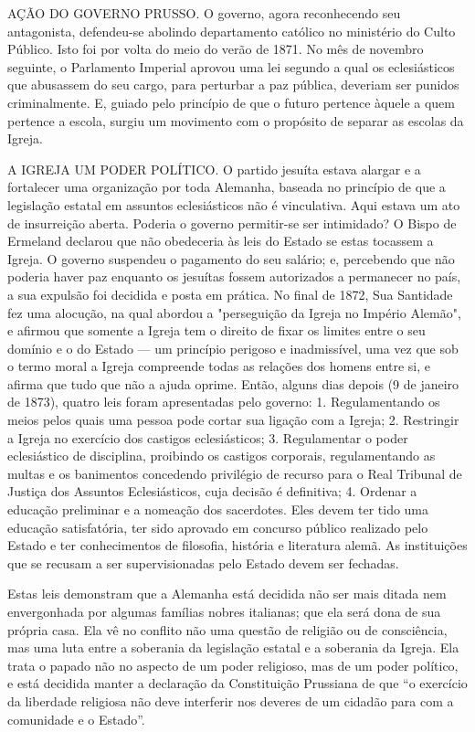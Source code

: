 \documentclass[11pt,a5paper,twoside,openany]{book}
\begin{document}
AÇÃO DO GOVERNO PRUSSO. O governo, agora reconhecendo seu antagonista, defendeu-se abolindo departamento católico no ministério do Culto Público. Isto foi por volta do meio do verão de 1871. No mês de novembro seguinte, o Parlamento Imperial aprovou uma lei segundo a qual os eclesiásticos que abusassem do seu cargo, para perturbar a paz pública, deveriam ser punidos criminalmente. E, guiado pelo princípio de que o futuro pertence àquele a quem pertence a escola, surgiu um movimento com o propósito de separar as escolas da Igreja.

A IGREJA UM PODER POLÍTICO. O partido jesuíta estava alargar e a fortalecer uma organização por toda Alemanha, baseada no princípio de que a legislação estatal em assuntos eclesiásticos não é vinculativa. Aqui estava um ato de insurreição aberta. Poderia o governo permitir-se ser intimidado? O Bispo de Ermeland declarou que não obedeceria às leis do Estado se estas tocassem a Igreja. O governo suspendeu o pagamento do seu salário; e, percebendo que não poderia haver paz enquanto os jesuítas fossem autorizados a permanecer no país, a sua expulsão foi decidida e posta em prática. No final de 1872, Sua Santidade fez uma alocução, na qual abordou a "perseguição da Igreja no Império Alemão", e afirmou que somente a Igreja tem o direito de fixar os limites entre o seu domínio e o do Estado — um princípio perigoso e inadmissível, uma vez que sob o termo moral a Igreja compreende todas as relações dos homens entre si, e afirma que tudo que não a ajuda oprime. Então, alguns dias depois (9 de janeiro de 1873), quatro leis foram apresentadas pelo governo: 1. Regulamentando os meios pelos quais uma pessoa pode cortar sua ligação com a Igreja; 2. Restringir a Igreja no exercício dos castigos eclesiásticos; 3. Regulamentar o poder eclesiástico de disciplina, proibindo os castigos corporais, regulamentando as multas e os banimentos concedendo privilégio de recurso para o Real Tribunal de Justiça dos Assuntos Eclesiásticos, cuja decisão é definitiva; 4. Ordenar a educação preliminar e a nomeação dos sacerdotes. Eles devem ter tido uma educação satisfatória, ter sido aprovado em concurso público realizado pelo Estado e ter conhecimentos de filosofia, história e literatura alemã. As instituições que se recusam a ser supervisionadas pelo Estado devem ser fechadas.

Estas leis demonstram que a Alemanha está decidida não ser mais ditada nem envergonhada por algumas famílias nobres italianas; que ela será dona de sua própria casa. Ela vê no conflito não uma questão de religião ou de consciência, mas uma luta entre a soberania da legislação estatal e a soberania da Igreja. Ela trata o papado não no aspecto de um poder religioso, mas de um poder político, e está decidida manter a declaração da Constituição Prussiana de que “o exercício da liberdade religiosa não deve interferir nos deveres de um cidadão para com a comunidade e o Estado”.
\end{document}
